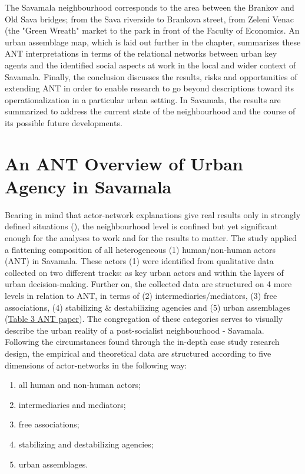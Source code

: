 \documentclass[11pt]{report}
\begin{document}
The Savamala neighbourhood corresponds to the area between the Brankov and Old Sava bridges; from the Sava riverside to Brankova street, from Zeleni Venac (the "Green Wreath" market to the park in front of the Faculty of Economics. An urban assemblage map, which is laid out further in the chapter, summarizes these ANT interpretations in terms of the relational networks between urban key agents and the identified social aspects at work in the local and wider context of Savamala. Finally, the conclusion discusses the results, risks and opportunities of extending ANT in order to enable research to go beyond descriptions toward its operationalization in a particular urban setting. In Savamala, the results are summarized to address the current state of the neighbourhood and the course of its possible future developments.

\section{An ANT Overview of Urban Agency in Savamala}

Bearing in mind that actor-network explanations give real results only in strongly defined situations (\href{Farias}{\citealt{farias_urban_2011}}), the neighbourhood level is confined but yet significant enough for the analyses to work and for the results to matter. The study applied a flattening composition of all heterogeneous (1) human/non-human actors (ANT) in Savamala. These actors (1) were identified from qualitative data collected on two different tracks: as key urban actors and within the layers of urban decision-making. Further on, the collected data are structured on 4 more levels in relation to ANT, in terms of (2) intermediaries/mediators, (3) free associations, (4) stabilizing \& destabilizing agencies and (5) urban assemblages (\href{ref}{Table 3 ANT paper}).
The congregation of these categories serves to visually describe the urban reality of a post-socialist neighbourhood - Savamala.
\\

Following the circumstances found through the in-depth case study research design, the empirical and theoretical data are structured according to five dimensions of actor-networks in the following way:

\begin{enumerate}
\item all human and non-human actors;
\item intermediaries and mediators;
\item free associations;
\item stabilizing and destabilizing agencies;
\item urban assemblages.
\end{enumerate}
\end{document}
